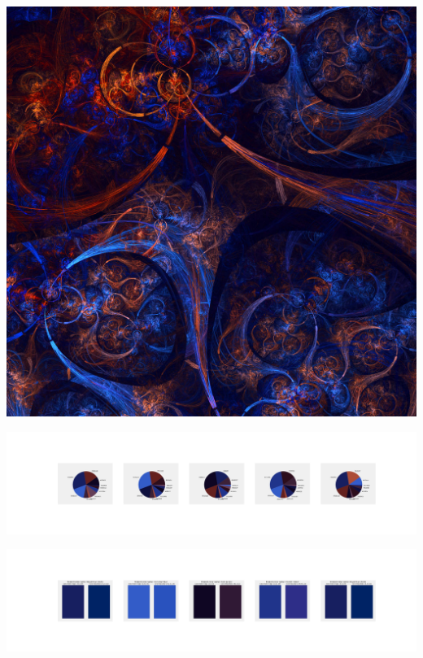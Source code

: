\documentclass[11pt]{article}
\begin{document}
\begin{landscape}
    \begin{center}
    \includegraphics[width=\textwidth]{./nbimg/file (226).jpg}
    \end{center}

    \begin{center}
    \includegraphics[width=250mm]{./nbimg/pie-141.jpg}
    \end{center}

    \begin{center}
    \includegraphics[width=250mm]{./nbimg/peak-141.jpg}
    \end{center}
    


\end{landscape}
\end{document}
